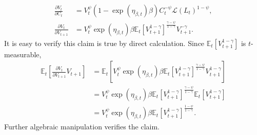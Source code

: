 \documentclass[12 pt, oneside]{article}
\theoremstyle{definition}
\theoremstyle{definition}
\theoremstyle{definition}
\newcommand{\E}{\mathbb{E}}
\newcommand{\calL}{\mathcal{L}}
\begin{document}
\begin{align*}
  \frac{\partial V_t}{\partial C_t} & = V_t^\psi(1 - \exp(\eta_{\beta, t})\beta) C_t^{-\psi}\calL(L_t)^{1 - \psi},\\
  \frac{\partial V_t}{\partial V_{t + 1}} & = V_t^\psi\exp(\eta_{\beta, t})\beta \E_t[V_{t + 1}^{1 - \gamma}]^{\frac{\gamma - \psi}{1 - \gamma}}V_{t + 1}^{ - \gamma}.
\end{align*}
It is easy to verify this claim is true by direct calculation. Since $\E_t[V_{t + 1}^{1 - \gamma}]$ is $t$-measurable,
\begin{align*}
  \E_t\left[\frac{\partial V_t}{\partial V_{t + 1}}V_{t + 1}\right] & = \E_t\left[V_t^\psi\exp(\eta_{\beta, t})\beta \E_t[V_{t + 1}^{1 - \gamma}]^{\frac{\gamma - \psi}{1 - \gamma}} V_{t + 1}^{1 - \gamma}\right]\\
                                                                    & = V_t^\psi\exp(\eta_{\beta, t})\beta \E_t[V_{t + 1}^{1 - \gamma}]^{\frac{\gamma - \psi}{1 - \gamma}}\E_t[V_{t + 1}^{1 - \gamma}]\\
                                                                    & = V_t^\psi\exp(\eta_{\beta, t})\beta \E_t[V_{t + 1}^{1 - \gamma}]^{\frac{1 - \psi}{1 - \gamma}}.
\end{align*}
Further algebraic manipulation verifies the claim.
\end{document}
